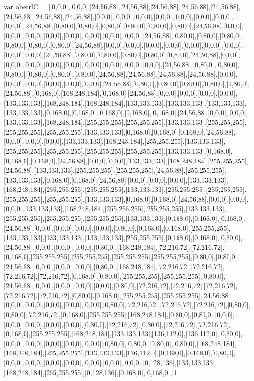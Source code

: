 var obetrlC = [[0,0,0],[0,0,0],[24,56,88],[24,56,88],[24,56,88],[24,56,88],[24,56,88],[24,56,88],[24,56,88],[24,56,88],[0,0,0],[0,0,0],[0,0,0],[0,0,0],[0,0,0],[0,0,0],[0,0,0],[0,0,0],[24,56,88],[0,80,0],[0,80,0],[0,80,0],[0,80,0],[0,80,0],[0,80,0],[24,56,88],[0,0,0],[0,0,0],[0,0,0],[0,0,0],[0,0,0],[0,0,0],[0,0,0],[0,0,0],[24,56,88],[0,80,0],[0,80,0],[0,80,0],[0,80,0],[0,80,0],[0,80,0],[24,56,88],[0,0,0],[0,0,0],[0,0,0],[0,0,0],[0,0,0],[0,0,0],[0,0,0],[0,0,0],[0,0,0],[24,56,88],[0,80,0],[0,80,0],[0,80,0],[0,80,0],[0,80,0],[24,56,88],[0,0,0],[0,0,0],[0,0,0],[0,0,0],[0,0,0],[0,0,0],[0,0,0],[0,0,0],[0,0,0],[24,56,88],[0,80,0],[0,80,0],[0,80,0],[0,80,0],[0,80,0],[0,80,0],[24,56,88],[24,56,88],[24,56,88],[24,56,88],[0,0,0],[0,0,0],[0,0,0],[0,0,0],[0,0,0],[0,0,0],[24,56,88],[0,80,0],[0,80,0],[0,80,0],[0,80,0],[0,80,0],[24,56,88],[0,168,0],[168,248,184],[0,168,0],[24,56,88],[0,0,0],[0,0,0],[0,0,0],[0,0,0],[133,133,133],[168,248,184],[168,248,184],[133,133,133],[133,133,133],[133,133,133],[133,133,133],[0,168,0],[0,168,0],[0,168,0],[0,168,0],[0,168,0],[24,56,88],[0,0,0],[0,0,0],[133,133,133],[168,248,184],[255,255,255],[255,255,255],[133,133,133],[255,255,255],[255,255,255],[255,255,255],[133,133,133],[0,168,0],[0,168,0],[0,168,0],[24,56,88],[0,0,0],[0,0,0],[0,0,0],[133,133,133],[168,248,184],[255,255,255],[133,133,133],[255,255,255],[255,255,255],[255,255,255],[255,255,255],[133,133,133],[0,168,0],[0,168,0],[0,168,0],[24,56,88],[0,0,0],[0,0,0],[133,133,133],[168,248,184],[255,255,255],[24,56,88],[133,133,133],[255,255,255],[255,255,255],[24,56,88],[255,255,255],[133,133,133],[0,168,0],[0,168,0],[24,56,88],[0,0,0],[0,0,0],[0,0,0],[133,133,133],[168,248,184],[255,255,255],[255,255,255],[133,133,133],[255,255,255],[255,255,255],[255,255,255],[255,255,255],[133,133,133],[0,168,0],[0,168,0],[24,56,88],[0,0,0],[0,0,0],[0,0,0],[133,133,133],[168,248,184],[255,255,255],[255,255,255],[133,133,133],[255,255,255],[255,255,255],[255,255,255],[133,133,133],[0,168,0],[0,168,0],[0,168,0],[24,56,88],[0,0,0],[0,0,0],[0,0,0],[0,0,0],[0,80,0],[0,168,0],[0,168,0],[255,255,255],[133,133,133],[133,133,133],[133,133,133],[255,255,255],[0,168,0],[0,168,0],[0,80,0],[24,56,88],[0,0,0],[0,0,0],[0,0,0],[0,80,0],[168,248,184],[72,216,72],[72,216,72],[0,168,0],[255,255,255],[255,255,255],[255,255,255],[255,255,255],[0,80,0],[0,80,0],[24,56,88],[0,0,0],[0,0,0],[0,0,0],[0,80,0],[168,248,184],[72,216,72],[72,216,72],[72,216,72],[72,216,72],[0,168,0],[0,80,0],[255,255,255],[255,255,255],[0,80,0],[24,56,88],[0,0,0],[0,0,0],[0,0,0],[0,0,0],[0,80,0],[72,216,72],[72,216,72],[72,216,72],[72,216,72],[72,216,72],[0,80,0],[0,168,0],[255,255,255],[255,255,255],[24,56,88],[0,0,0],[0,0,0],[0,0,0],[0,0,0],[0,0,0],[0,80,0],[72,216,72],[72,216,72],[72,216,72],[0,80,0],[0,80,0],[72,216,72],[0,168,0],[255,255,255],[168,248,184],[0,80,0],[0,80,0],[0,0,0],[0,0,0],[0,0,0],[0,0,0],[0,0,0],[0,80,0],[72,216,72],[0,80,0],[72,216,72],[72,216,72],[0,168,0],[255,255,255],[168,248,184],[133,133,133],[136,112,0],[136,112,0],[0,80,0],[0,0,0],[0,0,0],[0,0,0],[0,0,0],[0,0,0],[0,80,0],[0,80,0],[0,80,0],[0,80,0],[168,248,184],[168,248,184],[255,255,255],[133,133,133],[136,112,0],[0,168,0],[0,168,0],[0,80,0],[0,0,0],[0,0,0],[0,0,0],[0,0,0],[0,0,0],[0,0,0],[0,0,0],[0,128,136],[133,133,133],[168,248,184],[255,255,255],[0,128,136],[0,168,0],[0,168,0],[1
